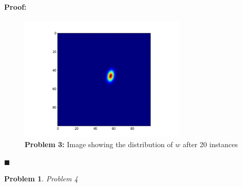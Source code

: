 \documentclass[12pt]{article}
\newenvironment{proof}{\paragraph{Proof: }}{\hfill$\blacksquare$}
\newtheorem{problem}{Problem}%
\begin{document}
\begin{proof}
\begin{figure}[!htbp]
\centering
\includegraphics[width=8cm]{hw2_p3_w_20.jpg}
\caption{\textbf{Problem 3:} Image showing the distribution of $w$ after 20 instances}
\end{figure}

\end{proof}

\begin{problem}
\normalfont
Problem 4
\end{problem}
\end{document}
